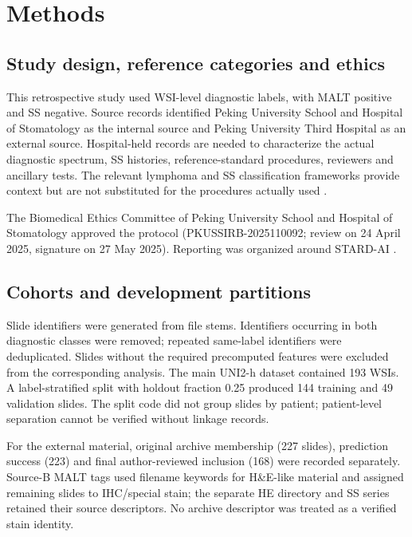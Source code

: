 \section{Methods}
\subsection{Study design, reference categories and ethics}

This retrospective study used WSI-level diagnostic labels, with MALT positive and SS negative. Source records identified Peking University School and Hospital of Stomatology as the internal source and Peking University Third Hospital as an external source.  Hospital-held records are needed to characterize the actual diagnostic spectrum, SS histories, reference-standard procedures, reviewers and ancillary tests. The relevant lymphoma and SS classification frameworks provide context but are not substituted for the procedures actually used \citep{ref3,ref4,ref17}. 

The Biomedical Ethics Committee of Peking University School and Hospital of Stomatology approved the protocol (PKUSSIRB-2025110092; review on 24 April 2025, signature on 27 May 2025).  Reporting was organized around STARD-AI \citep{ref20}.

\subsection{Cohorts and development partitions}

Slide identifiers were generated from file stems. Identifiers occurring in both diagnostic classes were removed; repeated same-label identifiers were deduplicated. Slides without the required precomputed features were excluded from the corresponding analysis. The main UNI2-h dataset contained 193 WSIs. A label-stratified split with holdout fraction 0.25 produced 144 training and 49 validation slides. The split code did not group slides by patient; patient-level separation cannot be verified without linkage records.

For the external material, original archive membership (227 slides), prediction success (223) and final author-reviewed inclusion (168) were recorded separately.  Source-B MALT tags used filename keywords for H\&E-like material and assigned remaining slides to IHC/special stain; the separate HE directory and SS series retained their source descriptors.  No archive descriptor was treated as a verified stain identity.

